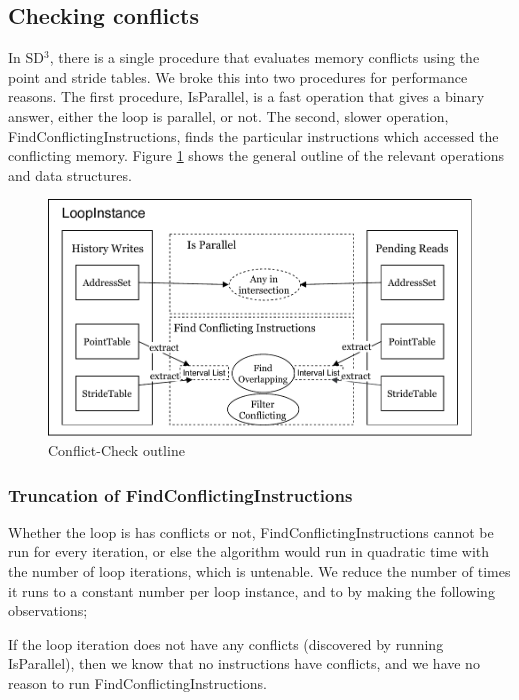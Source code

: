 \documentclass[12pt,twoside]{reedthesis}
\begin{document}
		\subsection{Checking conflicts}
			
			In SD$^3$, there is a single procedure that evaluates memory conflicts using the point and stride tables. We broke this into two procedures for performance reasons.  The first procedure, IsParallel, is a fast operation that gives a binary answer, either the loop is parallel, or not. The second, slower operation, FindConflictingInstructions, finds the particular instructions which accessed the conflicting memory. Figure \ref{fig:conflict-check} shows the general outline of the relevant operations and data structures.
			
			\begin{figure}
				\caption{Conflict-Check outline}
				\label{fig:conflict-check}
				\includegraphics[scale=1.0]{conflict-diagram.pdf}
			\end{figure}
		
		
		\subsubsection{Truncation of FindConflictingInstructions}

			Whether the loop is has conflicts or not, FindConflictingInstructions cannot be run for every iteration, or else the algorithm would run in quadratic time with the number of loop iterations, which is untenable. We reduce the number of times it runs to a constant number per loop instance, and to  by making the following observations; 
			
			If the loop iteration does not have any conflicts (discovered by running IsParallel), then we know that no instructions have conflicts, and we have no reason to run FindConflictingInstructions. 
			
\end{document}

